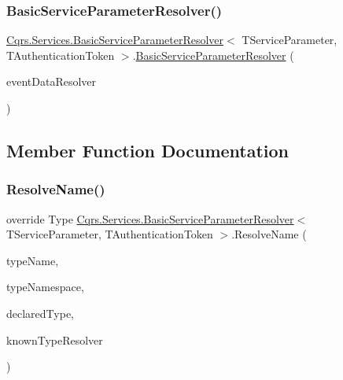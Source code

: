 \subsubsection{\texorpdfstring{Basic\+Service\+Parameter\+Resolver()}{BasicServiceParameterResolver()}\hspace{0.1cm}{\footnotesize\ttfamily [2/2]}}
{\footnotesize\ttfamily \hyperlink{classCqrs_1_1Services_1_1BasicServiceParameterResolver}{Cqrs.\+Services.\+Basic\+Service\+Parameter\+Resolver}$<$ T\+Service\+Parameter, T\+Authentication\+Token $>$.\hyperlink{classCqrs_1_1Services_1_1BasicServiceParameterResolver}{Basic\+Service\+Parameter\+Resolver} (\begin{DoxyParamCaption}\item[{\hyperlink{interfaceCqrs_1_1Services_1_1IEventDataResolver}{I\+Event\+Data\+Resolver}}]{event\+Data\+Resolver }\end{DoxyParamCaption})\hspace{0.3cm}{\ttfamily [protected]}}



\subsection{Member Function Documentation}
\mbox{\label{classCqrs_1_1Services_1_1BasicServiceParameterResolver_a8c598f2f49a83190c315afc88e5630d5_a8c598f2f49a83190c315afc88e5630d5}} 
\subsubsection{\texorpdfstring{Resolve\+Name()}{ResolveName()}}
{\footnotesize\ttfamily override Type \hyperlink{classCqrs_1_1Services_1_1BasicServiceParameterResolver}{Cqrs.\+Services.\+Basic\+Service\+Parameter\+Resolver}$<$ T\+Service\+Parameter, T\+Authentication\+Token $>$.Resolve\+Name (\begin{DoxyParamCaption}\item[{string}]{type\+Name,  }\item[{string}]{type\+Namespace,  }\item[{Type}]{declared\+Type,  }\item[{Data\+Contract\+Resolver}]{known\+Type\+Resolver }\end{DoxyParamCaption})}



